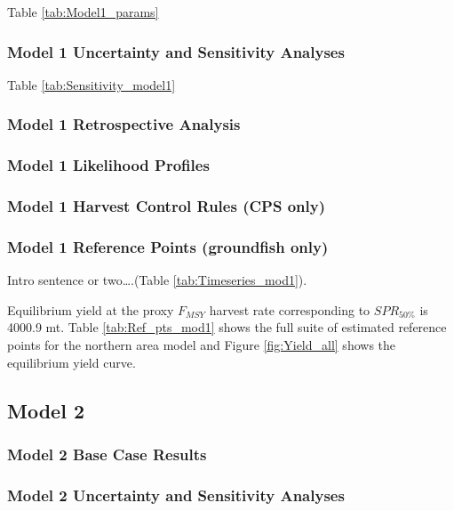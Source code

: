 \documentclass[12pt,]{article}
\begin{document}
Table \ref{tab:Model1_params}

\subsubsection{Model 1 Uncertainty and Sensitivity
Analyses}\label{model-1-uncertainty-and-sensitivity-analyses}

Table \ref{tab:Sensitivity_model1}

\subsubsection{Model 1 Retrospective
Analysis}\label{model-1-retrospective-analysis}

\subsubsection{Model 1 Likelihood
Profiles}\label{model-1-likelihood-profiles}

\subsubsection{Model 1 Harvest Control Rules (CPS
only)}\label{model-1-harvest-control-rules-cps-only}

\subsubsection{Model 1 Reference Points (groundfish
only)}\label{model-1-reference-points-groundfish-only}

Intro sentence or two\ldots{}.(Table \ref{tab:Timeseries_mod1}).

Equilibrium yield at the proxy \(F_{MSY}\) harvest rate corresponding to
\(SPR_{50\%}\) is 4000.9 mt. Table \ref{tab:Ref_pts_mod1} shows the full
suite of estimated reference points for the northern area model and
Figure \ref{fig:Yield_all} shows the equilibrium yield curve.

\subsection{Model 2}\label{model-2}

\subsubsection{Model 2 Base Case
Results}\label{model-2-base-case-results}

\subsubsection{Model 2 Uncertainty and Sensitivity
Analyses}\label{model-2-uncertainty-and-sensitivity-analyses}
\end{document}
